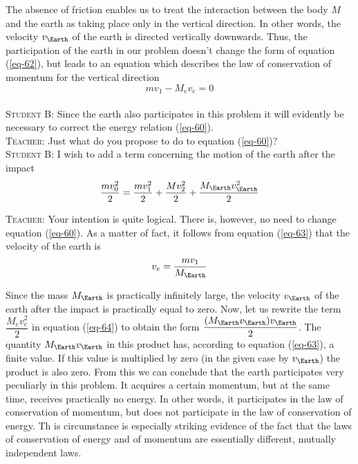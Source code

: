 \documentclass[a4paper,sfsidenotes]{tufte-book}
\begin{document}
The absence of friction enables us to treat the interaction between the body $M$ and the earth as taking place only in the vertical direction. In other words, the velocity $v_{\Earth}$ of the earth is directed vertically downwards. Thus, the participation of the earth in our problem doesn't change the form of equation (\ref{eq-62}), but leads to an equation which describes the law of conservation of momentum for the vertical direction
\begin{equation} 
mv_{1}  - M_{e}v_{e} = 0   
\label{eq-63}
\end{equation}
\\
\textsc{Student B:} Since the earth also participates in this problem it will evidently be necessary to correct the energy relation (\ref{eq-60}).
\\
\textsc{Teacher:} Just what do you propose to do to equation (\ref{eq-60})?
\\
\textsc{Student B:} I wish to add a term concerning the motion of the earth after the impact
\\
\begin{equation} 
\frac{mv_{0}^{2}}{2} = \frac{mv_{1}^{2}}{2} + \frac{Mv_{2}^{2}}{2} +  \frac{M_{\Earth}v_{\Earth}^{2}}{2} 
\label{eq-64}
\end{equation}

\textsc{Teacher:} Your intention is quite logical. There is, however, no need to change equation (\ref{eq-60}). As a matter of fact, it follows from equation (\ref{eq-63}) that the velocity of the earth is
\\
\begin{equation*}
v_{e} = \frac{mv_{1}}{M_{\Earth}}
\end{equation*}

Since the mass $M_{\Earth}$ is practically infinitely large, the velocity $v_{\Earth}$ of the earth after the impact is practically equal to zero. Now, let us rewrite the term $\dfrac{M_{e}v_{e}^{2}}{2} $ in equation (\ref{eq-64}) to obtain the form $\dfrac{(M_{\Earth}v_{\Earth})v_{\Earth}}{2}$. The quantity $M_{\Earth}v_{\Earth}$ in this product has, according to equation (\ref{eq-63}), a finite value. If this value is multiplied by zero (in the given case by $v_{\Earth}$) the product is also zero. From this we can conclude that the earth participates very peculiarly in this problem. It acquires a certain momentum, but at the same time, receives practically no energy. In other words, it participates in the law of conservation of momentum, but does not participate in the law of conservation of energy. Th is circumstance is especially striking evidence of the fact that the laws of conservation of energy and of momentum are essentially different, mutually independent laws.
\\
\end{document}
